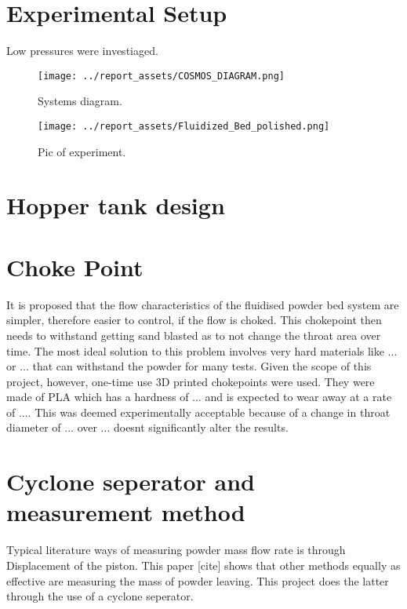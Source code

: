 \section{Experimental Setup}
Low pressures were investiaged.
\begin{figure}[htbp]
    \centering

    \begin{minipage}{0.45\textwidth}
        \centering
        \texttt{[image: ../report\_assets/COSMOS\_DIAGRAM.png]}
        \caption{Systems diagram.}
        \label{fig:systems-diagram}
    \end{minipage}
    \hfill
    \begin{minipage}{0.45\textwidth}
        \centering
        \texttt{[image: ../report\_assets/Fluidized\_Bed\_polished.png]}
        \caption{Pic of experiment.}
        \label{fig:experiment-image}
    \end{minipage}

\end{figure}

\newpage
\section{Hopper tank design}

\section{Choke Point}
It is proposed that the flow characteristics of the fluidised powder bed system are simpler, therefore easier to control, if the flow is choked. This chokepoint then needs to withstand getting sand blasted as to not change the throat area over time. The most ideal solution to this problem involves very hard materials like ... or ... that can withstand the powder for many tests. Given the scope of this project, however, one-time use 3D printed chokepoints were used. They were made of PLA which has a hardness of ... and is expected to wear away at a rate of .... This was deemed experimentally acceptable because of a change in throat diameter of ... over ... doesnt significantly alter the results.

\newpage
\section{Cyclone seperator and measurement method}
Typical literature ways of measuring powder mass flow rate is through Displacement of the piston. This paper [cite] shows that other methods equally as effective are measuring the mass of powder leaving. This project does the latter through the use of a cyclone seperator.

